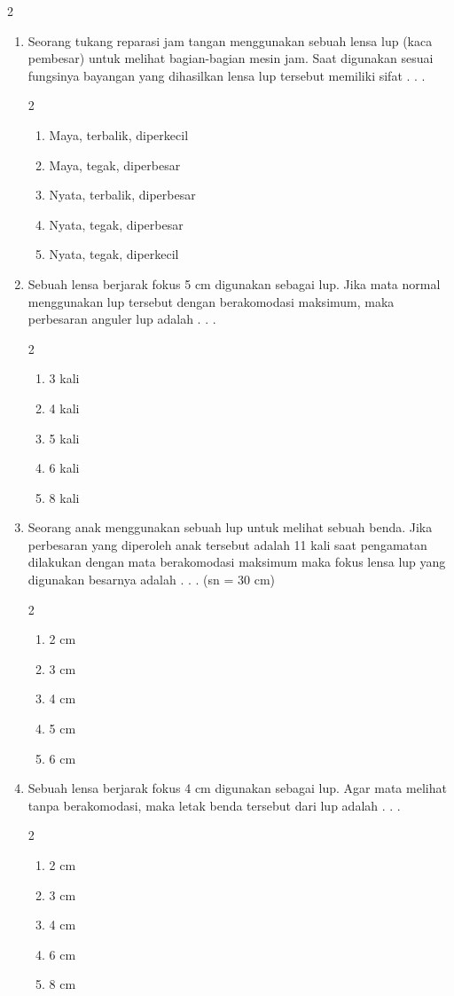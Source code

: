 \documentclass[10pt,a4paper]{extarticle}
\newcommand{\pilgani}[1]{                            \vspace{-0.3cm}\begin{multicols}{2}
 \begin{enumerate}[label=\Alph*., itemsep=0pt,topsep=0pt,leftmargin=*,align=Center]#1                     \end{enumerate}
 \phantom{ini cuma sapi, wedus, dan ayam}
 \end{multicols}}
\begin{document}
\begin{multicols*}{2}
\begin{enumerate}
\item Seorang tukang reparasi jam tangan menggunakan  sebuah lensa lup (kaca pembesar)  untuk melihat bagian-bagian mesin jam. Saat digunakan sesuai fungsinya bayangan yang dihasilkan lensa lup tersebut  memiliki sifat . . .
\pilgani{
	\item Maya, terbalik, diperkecil
	\item Maya, tegak, diperbesar
	\item Nyata, terbalik, diperbesar
	\item Nyata, tegak, diperbesar
	\item Nyata, tegak, diperkecil
}
\vspace{2cm}

\item Sebuah lensa berjarak fokus 5 cm digunakan sebagai lup. Jika mata normal menggunakan lup tersebut dengan berakomodasi maksimum, maka perbesaran anguler lup adalah . . . 
\pilgani{
	\item 3 kali
	\item 4 kali
	\item 5 kali
	\item 6 kali
	\item 8 kali }
\vspace{2cm}

\item Seorang anak menggunakan sebuah lup untuk melihat sebuah benda. Jika perbesaran yang diperoleh anak tersebut adalah 11 kali saat pengamatan dilakukan dengan mata berakomodasi maksimum maka fokus lensa lup yang digunakan besarnya adalah . . . (sn = 30 cm)
\pilgani{
	\item 2 cm
	\item 3 cm
	\item 4 cm
	\item 5 cm
	\item 6 cm }
\vspace{2cm}

\item Sebuah lensa berjarak fokus 4 cm digunakan sebagai lup. Agar mata melihat tanpa berakomodasi, maka letak benda tersebut dari lup adalah . . .
\pilgani{
	\item 2 cm
	\item 3 cm
	\item 4 cm
	\item 6 cm
	\item 8 cm
}
\vspace{2cm}


\end{enumerate}
\end{multicols*}
\end{document}
